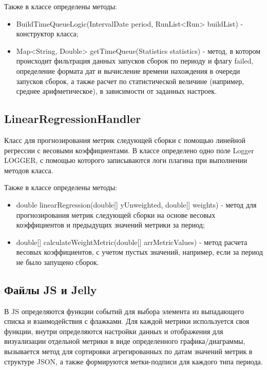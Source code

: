 Также в классе определены методы:

\begin{itemize}
	\item BuildTimeQueueLogic(IntervalDate period, RunList<Run> buildList) - конструктор класса;
	\item Map<String, Double> getTimeQueue(Statistics statistics) - метод, в котором происходит фильтрация данных запусков сборок по периоду и флагу failed, определение формата дат и вычисление времени нахождения в очереди запусков сборок, а также расчет по статистической величине (например, среднее арифметическое), в зависимости от заданных настроек.
\end{itemize}

\subsection{LinearRegressionHandler}

Класс для прогнозирования метрик следующей сборки с помощью линейной регрессии с весовыми коэффициентами. В классе определено одно поле Logger LOGGER, с помощью которого записываются логи плагина при выполнении методов класса.


Также в классе определены методы:

\begin{itemize}
	\item double linearRegression(double[] yUnweighted, double[] weights) - метод для прогнозирования метрик следующей сборки на основе весовых коэффициентов и предыдущих значений метрики за период;
	\item double[] calculateWeightMetric(double[] arrMetricValues) - метод расчета весовых коэффициентов, с учетом пустых значений, например, если за период не было запущено сборок.
\end{itemize}

\subsection{Файлы JS и Jelly}

В JS определяются функции событий для выбора элемента из выпадающего списка и взаимодействия с флажками. Для каждой метрики используется своя функции, внутри определяются настройки данных и отображения для визуализации отдельной метрики в виде определенного графика/диаграммы, вызывается метод для сортировки агрегированных по датам значений метрик в структуре JSON, а также формируются метки-подписи для каждого типа периода.


